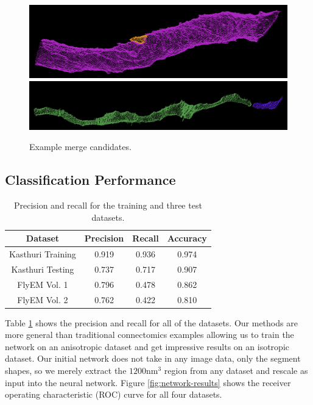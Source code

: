 \begin{figure}[t!]
	\centering
	\includegraphics[width=0.85\linewidth]{./figures/merge_candidate1.png}
	\includegraphics[width=0.85\linewidth]{./figures/merge_candidate2.png}
	\caption{Example merge candidates.}
	\label{fig:skeleton-results}
\end{figure}


\subsection{Classification Performance}

\begin{table}
	\centering
	\begin{tabular}{c c c c} \hline
	\textbf{Dataset} & \textbf{Precision} & \textbf{Recall} & \textbf{Accuracy} \\ \hline
	Kasthuri Training & 0.919 & 0.936 & 0.974 \\
	Kasthuri Testing & 0.737 & 0.717 & 0.907 \\
	FlyEM Vol. 1 & 0.796 & 0.478 & 0.862 \\ 
	FlyEM Vol. 2 & 0.762 & 0.422 & 0.810 \\ \hline
	\end{tabular}
	\caption{Precision and recall for the training and three test datasets.}
	\label{table:classification}
\end{table}

Table \ref{table:classification} shows the precision and recall for all of the datasets. 
Our methods are more general than traditional connectomics examples allowing us to train the network on an anisotropic dataset and get impressive results on an isotropic dataset. 
Our initial network does not take in any image data, only the segment shapes, so we merely extract the $1200 \textrm{nm}^3$ region from any dataset and rescale as input into the neural network. 
Figure \ref{fig:network-results} shows the receiver operating characteristic (ROC) curve for all four datasets. 

